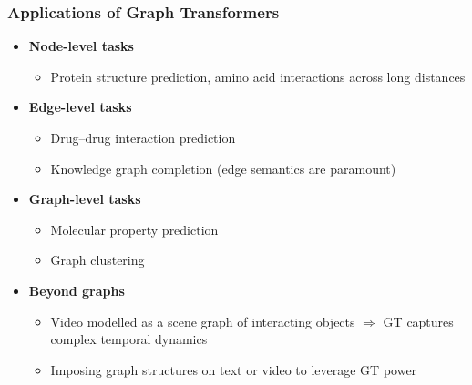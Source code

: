 \begin{frame}[fragile]\frametitle{Applications of Graph Transformers}

\begin{itemize}
  \item \textbf{Node-level tasks}
    \begin{itemize}
      \item Protein structure prediction, amino acid interactions across long distances
    \end{itemize}

  \item \textbf{Edge-level tasks}
    \begin{itemize}
      \item Drug--drug interaction prediction
      \item Knowledge graph completion (edge semantics are paramount)
    \end{itemize}

  \item \textbf{Graph-level tasks}
    \begin{itemize}
      \item Molecular property prediction
      \item Graph clustering
    \end{itemize}

  \item \textbf{Beyond graphs}
    \begin{itemize}
      \item Video modelled as a scene graph of interacting objects $\Rightarrow$ GT captures complex temporal dynamics
      \item Imposing graph structures on text or video to leverage GT power
    \end{itemize}
\end{itemize}

\end{frame}


